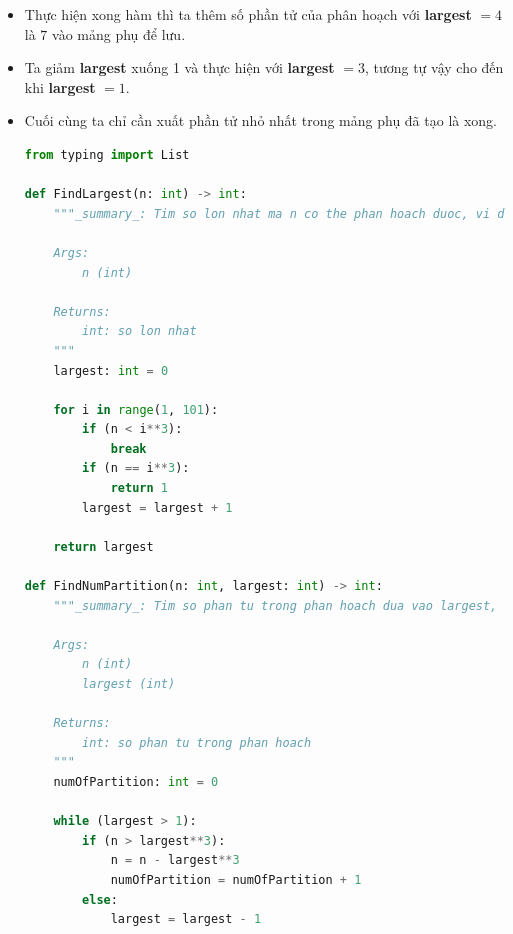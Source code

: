 \documentclass[12pt]{article}
\begin{document}
\begin{itemize}
\begin{itemize}
        \item Lần lặp cuối ta thấy $n < \textbf{largest}^3$ nên giảm \textbf{largest} xuống còn 1 và vòng while thực hiện xong.

        \item Sau khi thoát khỏi vòng while ta thấy $n$ vẫn còn sót lại và $n < 8$ ($n = 4$) nên số phần tử trong phân hoạch còn lại chính là $n$ luôn. (Tức là $4 = 1^3 + 1^3 +1^3 + 1^3$).

        \item Vậy ta có \textbf{numOfPartition} $= 7$ và kết quả cuối cùng là $84 = 4^3 + 2^3 + 2^3 + 1^3 + 1^3 + 1^3 + 1^3$.
    \end{itemize}

    \item Thực hiện xong hàm thì ta thêm số phần tử của phân hoạch với \textbf{largest} $= 4$ là $7$ vào mảng phụ để lưu.

    \item Ta giảm \textbf{largest} xuống 1 và thực hiện với \textbf{largest} $= 3$, tương tự vậy cho đến khi \textbf{largest} $=1$.

    \item Cuối cùng ta chỉ cần xuất phần tử nhỏ nhất trong mảng phụ đã tạo là xong.

\begin{lstlisting}[language=Python]
from typing import List

def FindLargest(n: int) -> int:
    """_summary_: Tim so lon nhat ma n co the phan hoach duoc, vi du 84 thi se tra ve 4 do 4^3 = 64 < 84 nhung 5^3 = 125 > 84

    Args:
        n (int)

    Returns:
        int: so lon nhat
    """
    largest: int = 0

    for i in range(1, 101):
        if (n < i**3):
            break
        if (n == i**3):
            return 1
        largest = largest + 1

    return largest 

def FindNumPartition(n: int, largest: int) -> int:
    """_summary_: Tim so phan tu trong phan hoach dua vao largest, vi du largest la 4 thi so phan hoac la 7 do 84 = 4^3 + 2^3 + 2^3 + 1^3 + 1^3 + 1^3 + 1^3

    Args:
        n (int)
        largest (int)

    Returns:
        int: so phan tu trong phan hoach
    """
    numOfPartition: int = 0

    while (largest > 1):
        if (n > largest**3):
            n = n - largest**3
            numOfPartition = numOfPartition + 1
        else:
            largest = largest - 1


\end{lstlisting}
\end{itemize}
\end{document}
